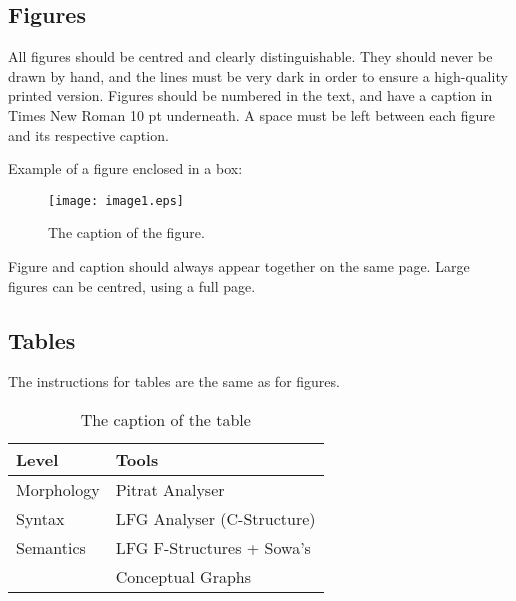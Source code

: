 \documentclass[10pt, a4paper]{article}
\begin{document}
\subsection{Figures}

All figures should be centred and clearly distinguishable. They should never be
drawn by hand, and the lines must be very dark in order to ensure a high-quality
printed version. Figures should be numbered in the text, and have a caption in
Times New Roman 10 pt underneath. A space must be left between each figure and
its respective caption. 

Example of a figure enclosed in a box:

\begin{figure}[!h]
\begin{center}
\texttt{[image: image1.eps]} 
\caption{The caption of the figure.}
\label{fig.1}
\end{center}
\end{figure}

Figure and caption should always appear together on the same page. Large figures
can be centred, using a full page.

\subsection{Tables}

The instructions for tables are the same as for figures.
%
\begin{table}[!h]
\begin{center}
\begin{tabularx}{\columnwidth}{|l|X|}

      \hline
      Level&Tools\\
      \hline
      Morphology & Pitrat Analyser\\
      \hline
      Syntax & LFG Analyser (C-Structure)\\
      \hline
     Semantics & LFG F-Structures + Sowa's\\
     & Conceptual Graphs\\
      \hline

\end{tabularx}
\caption{The caption of the table}
 \end{center}
\end{table}
\end{document}
